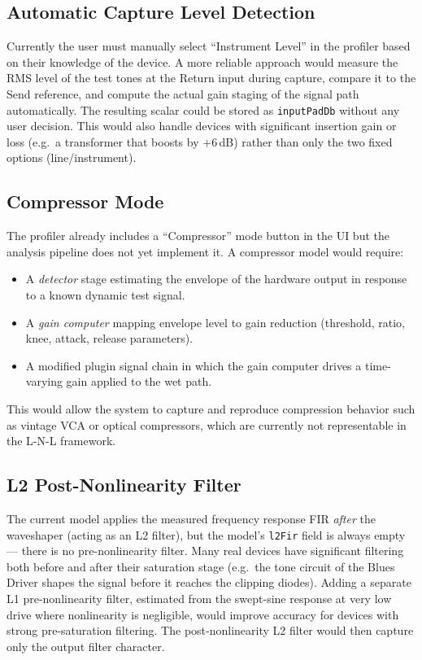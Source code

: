 \documentclass[11pt, letterpaper]{article}
\begin{document}
\subsection{Automatic Capture Level Detection}

Currently the user must manually select ``Instrument Level'' in the profiler
based on their knowledge of the device.  A more reliable approach would measure
the RMS level of the test tones at the Return input during capture, compare it
to the Send reference, and compute the actual gain staging of the signal path
automatically.  The resulting scalar could be stored as \texttt{inputPadDb}
without any user decision.  This would also handle devices with significant
insertion gain or loss (e.g.\ a transformer that boosts by $+6$\,dB) rather
than only the two fixed options (line/instrument).

\subsection{Compressor Mode}

The profiler already includes a ``Compressor'' mode button in the UI but the
analysis pipeline does not yet implement it.  A compressor model would require:
\begin{itemize}[leftmargin=1.5em]
    \item A \emph{detector} stage estimating the envelope of the hardware
          output in response to a known dynamic test signal.
    \item A \emph{gain computer} mapping envelope level to gain reduction
          (threshold, ratio, knee, attack, release parameters).
    \item A modified plugin signal chain in which the gain computer drives
          a time-varying gain applied to the wet path.
\end{itemize}
This would allow the system to capture and reproduce compression behavior such
as vintage VCA or optical compressors, which are currently not representable in
the L-N-L framework.

\subsection{L2 Post-Nonlinearity Filter}

The current model applies the measured frequency response FIR \emph{after} the
waveshaper (acting as an L2 filter), but the model's \texttt{l2Fir} field is
always empty — there is no pre-nonlinearity filter.  Many real devices have
significant filtering both before and after their saturation stage (e.g.\ the
tone circuit of the Blues Driver shapes the signal before it reaches the
clipping diodes).  Adding a separate L1 pre-nonlinearity filter, estimated from
the swept-sine response at very low drive where nonlinearity is negligible,
would improve accuracy for devices with strong pre-saturation filtering.  The
post-nonlinearity L2 filter would then capture only the output filter character.
\end{document}
